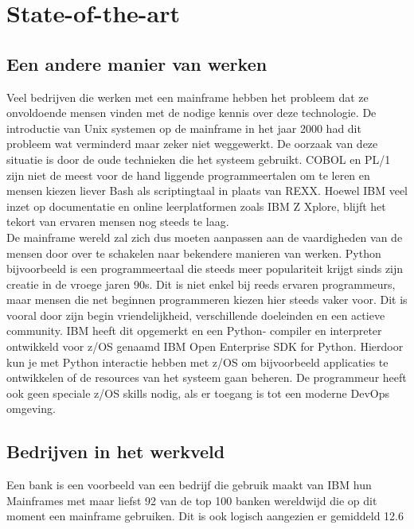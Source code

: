 
\section{State-of-the-art}%
\label{sec:state-of-the-art}

\subsection{Een andere manier van werken}
Veel bedrijven die werken met een mainframe hebben het probleem dat ze onvoldoende mensen vinden met de nodige kennis over deze technologie. De introductie van Unix systemen op de mainframe in het jaar 2000 \autocite{Mertic2020} had dit probleem wat verminderd maar zeker niet weggewerkt. De oorzaak van deze situatie is door de oude technieken die het systeem gebruikt. COBOL en PL/1 zijn niet de meest voor de hand liggende programmeertalen om te leren en mensen kiezen liever Bash als scriptingtaal in plaats van REXX. Hoewel IBM veel inzet op documentatie en online leerplatformen zoals IBM Z Xplore, blijft het tekort van ervaren mensen nog steeds te laag. \\

De mainframe wereld zal zich dus moeten aanpassen aan de vaardigheden van de mensen door over te schakelen naar bekendere manieren van werken. 
Python bijvoorbeeld is een programmeertaal die steeds meer populariteit krijgt sinds zijn creatie in de vroege jaren 90s. Dit is niet enkel bij reeds ervaren programmeurs, maar mensen die net beginnen programmeren kiezen hier steeds vaker voor. Dit is vooral door zijn begin vriendelijkheid, verschillende doeleinden en een actieve community. \autocite{Johnson2023}
IBM heeft dit opgemerkt en een Python- compiler en interpreter ontwikkeld voor z/OS genaamd IBM Open Enterprise SDK for Python. Hierdoor kun je met Python interactie hebben met z/OS om bijvoorbeeld applicaties te ontwikkelen of de resources van het systeem gaan beheren. De programmeur heeft ook geen speciale z/OS skills nodig, als er toegang is tot een moderne DevOps omgeving. \autocite{Klaey2023}

\subsection{Bedrijven in het werkveld}
Een bank is een voorbeeld van een bedrijf die gebruik maakt van IBM hun Mainframes met maar liefst 92 van de top 100 banken wereldwijd die op dit moment een mainframe gebruiken. Dit is ook logisch aangezien er gemiddeld 12.6 \autocite{Wagle2017} 

